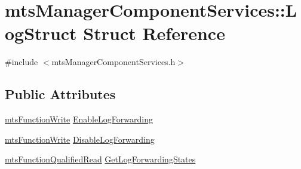 \hypertarget{structmts_manager_component_services_1_1_log_struct}{\section{mts\-Manager\-Component\-Services\-:\-:Log\-Struct Struct Reference}
\label{structmts_manager_component_services_1_1_log_struct}
}


{\ttfamily \#include $<$mts\-Manager\-Component\-Services.\-h$>$}

\subsection*{Public Attributes}
\begin{DoxyCompactItemize}
\item 
\hyperlink{classmts_function_write}{mts\-Function\-Write} \hyperlink{structmts_manager_component_services_1_1_log_struct_aeb9d7421249c425d58f0cff939bb7c12}{Enable\-Log\-Forwarding}
\item 
\hyperlink{classmts_function_write}{mts\-Function\-Write} \hyperlink{structmts_manager_component_services_1_1_log_struct_a81e6b9e5d9cdc2e656d10a4bdd2809f4}{Disable\-Log\-Forwarding}
\item 
\hyperlink{classmts_function_qualified_read}{mts\-Function\-Qualified\-Read} \hyperlink{structmts_manager_component_services_1_1_log_struct_afc7c70d03ea7f0f532e7b9154329d71b}{Get\-Log\-Forwarding\-States}
\end{DoxyCompactItemize}


